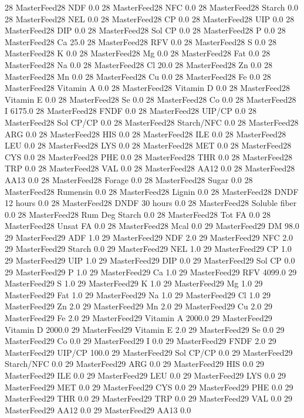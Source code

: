 \documentclass[letterpaper,10pt,english]{sphinxmanual}
\begin{document}
\begin{sphinxVerbatim}[commandchars=\\\{\},numbers=left,firstnumber=1,stepnumber=1]
28 MasterFeed28 NDF 0.0
28 MasterFeed28 NFC 0.0
28 MasterFeed28 Starch 0.0
28 MasterFeed28 NEL 0.0
28 MasterFeed28 CP 0.0
28 MasterFeed28 UIP 0.0
28 MasterFeed28 DIP 0.0
28 MasterFeed28 Sol CP 0.0
28 MasterFeed28 P 0.0
28 MasterFeed28 Ca 25.0
28 MasterFeed28 RFV 0.0
28 MasterFeed28 S 0.0
28 MasterFeed28 K 0.0
28 MasterFeed28 Mg 0.0
28 MasterFeed28 Fat 0.0
28 MasterFeed28 Na 0.0
28 MasterFeed28 Cl 20.0
28 MasterFeed28 Zn 0.0
28 MasterFeed28 Mn 0.0
28 MasterFeed28 Cu 0.0
28 MasterFeed28 Fe 0.0
28 MasterFeed28 Vitamin A 0.0
28 MasterFeed28 Vitamin D 0.0
28 MasterFeed28 Vitamin E 0.0
28 MasterFeed28 Se 0.0
28 MasterFeed28 Co 0.0
28 MasterFeed28 I 6175.0
28 MasterFeed28 FNDF 0.0
28 MasterFeed28 UIP/CP 0.0
28 MasterFeed28 Sol CP/CP 0.0
28 MasterFeed28 Starch/NFC 0.0
28 MasterFeed28 ARG 0.0
28 MasterFeed28 HIS 0.0
28 MasterFeed28 ILE 0.0
28 MasterFeed28 LEU 0.0
28 MasterFeed28 LYS 0.0
28 MasterFeed28 MET 0.0
28 MasterFeed28 CYS 0.0
28 MasterFeed28 PHE 0.0
28 MasterFeed28 THR 0.0
28 MasterFeed28 TRP 0.0
28 MasterFeed28 VAL 0.0
28 MasterFeed28 AA\PYGZsh{}12 0.0
28 MasterFeed28 AA\PYGZsh{}13 0.0
28 MasterFeed28 \PYGZpc{} Forage 0.0
28 MasterFeed28 Sugar \PYGZpc{} 0.0
28 MasterFeed28 Rumensin 0.0
28 MasterFeed28 Lignin 0.0
28 MasterFeed28 DNDF 12 hours 0.0
28 MasterFeed28 DNDF 30 hours 0.0
28 MasterFeed28 Soluble fiber 0.0
28 MasterFeed28 Rum Deg Starch 0.0
28 MasterFeed28 Tot FA 0.0
28 MasterFeed28 Unsat FA 0.0
28 MasterFeed28 Mcal 0.0
29 MasterFeed29 DM 98.0
29 MasterFeed29 ADF 1.0
29 MasterFeed29 NDF 2.0
29 MasterFeed29 NFC 2.0
29 MasterFeed29 Starch 0.0
29 MasterFeed29 NEL 1.0
29 MasterFeed29 CP 1.0
29 MasterFeed29 UIP 1.0
29 MasterFeed29 DIP 0.0
29 MasterFeed29 Sol CP 0.0
29 MasterFeed29 P 1.0
29 MasterFeed29 Ca 1.0
29 MasterFeed29 RFV 4099.0
29 MasterFeed29 S 1.0
29 MasterFeed29 K 1.0
29 MasterFeed29 Mg 1.0
29 MasterFeed29 Fat 1.0
29 MasterFeed29 Na 1.0
29 MasterFeed29 Cl 1.0
29 MasterFeed29 Zn 2.0
29 MasterFeed29 Mn 2.0
29 MasterFeed29 Cu 2.0
29 MasterFeed29 Fe 2.0
29 MasterFeed29 Vitamin A 2000.0
29 MasterFeed29 Vitamin D 2000.0
29 MasterFeed29 Vitamin E 2.0
29 MasterFeed29 Se 0.0
29 MasterFeed29 Co 0.0
29 MasterFeed29 I 0.0
29 MasterFeed29 FNDF 2.0
29 MasterFeed29 UIP/CP 100.0
29 MasterFeed29 Sol CP/CP 0.0
29 MasterFeed29 Starch/NFC 0.0
29 MasterFeed29 ARG 0.0
29 MasterFeed29 HIS 0.0
29 MasterFeed29 ILE 0.0
29 MasterFeed29 LEU 0.0
29 MasterFeed29 LYS 0.0
29 MasterFeed29 MET 0.0
29 MasterFeed29 CYS 0.0
29 MasterFeed29 PHE 0.0
29 MasterFeed29 THR 0.0
29 MasterFeed29 TRP 0.0
29 MasterFeed29 VAL 0.0
29 MasterFeed29 AA\PYGZsh{}12 0.0
29 MasterFeed29 AA\PYGZsh{}13 0.0

\end{sphinxVerbatim}
\end{document}
